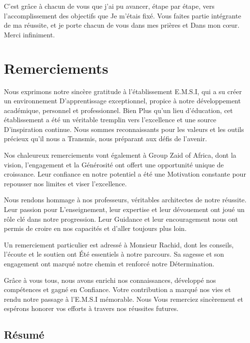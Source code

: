 \documentclass[a4paper,11pt]{report}
\begin{document}
C’est grâce à chacun de vous que j’ai pu avancer, étape par étape, vers l’accomplissement des objectifs que Je m’étais fixé. Vous faites partie intégrante de ma réussite, et je porte chacun de vous dans mes prières et Dans mon cœur. Merci infiniment.

\newpage
\thispagestyle{empty}
\chapter*{Remerciements}

Nous exprimons notre sincère gratitude à l’établissement E.M.S.I, qui a su créer un environnement D’apprentissage exceptionnel, propice à notre développement académique, personnel et professionnel. Bien Plus qu’un lieu d’éducation, cet établissement a été un véritable tremplin vers l’excellence et une source D’inspiration continue. Nous sommes reconnaissants pour les valeurs et les outils précieux qu’il nous a Transmis, nous préparant aux défis de l’avenir.

Nos chaleureux remerciements vont également à Group Zaid of Africa, dont la vision, l’engagement et la Générosité ont offert une opportunité unique de croissance. Leur confiance en notre potentiel a été une Motivation constante pour repousser nos limites et viser l’excellence.

Nous rendons hommage à nos professeurs, véritables architectes de notre réussite. Leur passion pour L’enseignement, leur expertise et leur dévouement ont joué un rôle clé dans notre progression. Leur Guidance et leur encouragement nous ont permis de croire en nos capacités et d’aller toujours plus loin.

Un remerciement particulier est adressé à Monsieur Rachid, dont les conseils, l’écoute et le soutien ont Été essentiels à notre parcours. Sa sagesse et son engagement ont marqué notre chemin et renforcé notre Détermination.

Grâce à vous tous, nous avons enrichi nos connaissances, développé nos compétences et gagné en Confiance. Votre contribution a marqué nos vies et rendu notre passage à l’E.M.S.I mémorable. Nous Vous remerciez sincèrement et espérons honorer vos efforts à travers nos réussites futures.

\newpage
\thispagestyle{empty}
\section*{Résumé}
\end{document}

